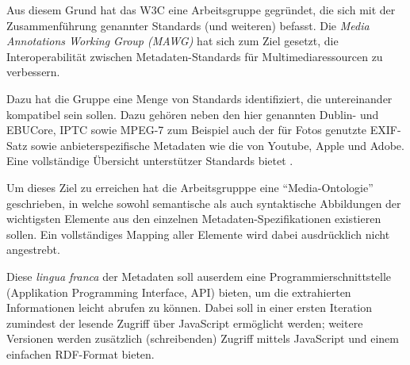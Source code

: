 	Aus diesem Grund hat das W3C eine Arbeitsgruppe gegründet, die sich mit der Zusammenführung genannter Standards (und weiteren) befasst. Die \emph{Media Annotations Working Group (MAWG)} hat sich zum Ziel gesetzt, die Interoperabilität zwischen Metadaten-Standards für Multimediaressourcen zu verbessern.
	
	Dazu hat die Gruppe eine Menge von Standards identifiziert, die untereinander kompatibel sein sollen. Dazu gehören neben den hier genannten Dublin- und EBUCore, IPTC	sowie MPEG-7 zum Beispiel auch der für Fotos genutzte EXIF-Satz sowie anbieterspezifische Metadaten wie die von Youtube, Apple und Adobe. Eine vollständige Übersicht unterstützer Standards bietet \cite{W3C:MAWG:mappings}.
	
	Um dieses Ziel zu erreichen hat die Arbeitsgrupppe eine \enquote{Media-Ontologie} geschrieben, in welche sowohl semantische als auch syntaktische Abbildungen der wichtigsten Elemente aus den einzelnen Metadaten-Spezifikationen existieren sollen. Ein vollständiges Mapping aller Elemente wird dabei ausdrücklich nicht angestrebt.\cite{W3C:MAWG:mission} \cite{W3C:MAWG:scope}
	
	Diese \emph{lingua franca} der Metadaten soll auserdem eine Programmierschnittstelle (Applikation Programming Interface, API) bieten, um die extrahierten Informationen leicht abrufen zu können. Dabei soll in einer ersten Iteration zumindest der lesende Zugriff über JavaScript ermöglicht werden; weitere Versionen werden zusätzlich (schreibenden) Zugriff mittels JavaScript und einem einfachen RDF-Format bieten.
	
	
	
